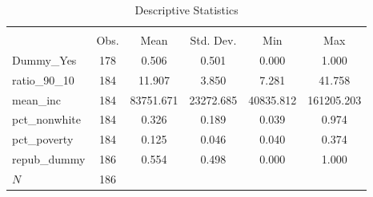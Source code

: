 \begin{table}[htbp]
\centering
\caption{Descriptive Statistics}
\label{tab:descriptives}
\begin{tabular}{lccccc}
\toprule
            &\multicolumn{5}{c}{}                                            \\
            &        Obs.&        Mean&   Std. Dev.&         Min&         Max\\
\midrule
Dummy\_Yes   &         178&       0.506&       0.501&       0.000&       1.000\\
ratio\_90\_10 &         184&      11.907&       3.850&       7.281&      41.758\\
mean\_inc    &         184&   83751.671&   23272.685&   40835.812&  161205.203\\
pct\_nonwhite&         184&       0.326&       0.189&       0.039&       0.974\\
pct\_poverty &         184&       0.125&       0.046&       0.040&       0.374\\
repub\_dummy &         186&       0.554&       0.498&       0.000&       1.000\\
\midrule
\(N\)       &         186&            &            &            &            \\
\bottomrule
\end{tabular}
\end{table}

